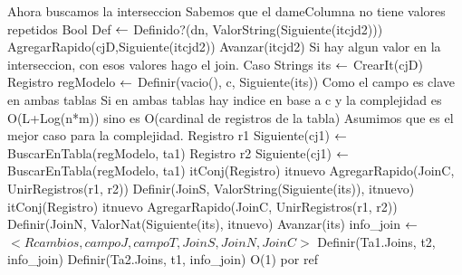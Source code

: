{		\State	Ahora buscamos la interseccion
		 
			\State Sabemos que el dameColumna no tiene valores repetidos
			\State Bool Def $\leftarrow$ Definido?(dn, ValorString(Siguiente(itcjd2)))
				AgregarRapido(cjD,Siguiente(itcjd2))
		     \EndIf
			\State	Avanzar(itcjd2)
		\EndWhile
	\EndIf
	\State Si hay algun valor en la interseccion, con esos valores hago el join.
		\State Caso Strings
		\State its $\leftarrow$ CrearIt(cjD) 
		 
			\State	Registro regModelo $\leftarrow$ Definir(vacio(), c, Siguiente(its))
			\State	Como el campo es clave en ambas tablas
			\State	Si en ambas tablas hay indice en base a c y la complejidad es 
			\State	O(L+Log(n*m)) sino es O(cardinal de registros de la tabla)
			\State	Asumimos que es el mejor caso para la complejidad.
			\State Registro r1 Siguiente(cj1) $\leftarrow$ BuscarEnTabla(regModelo, ta1)
			\State Registro r2 Siguiente(cj1) $\leftarrow$ BuscarEnTabla(regModelo, ta1)
				\State itConj(Registro) itnuevo AgregarRapido(JoinC, UnirRegistros(r1, r2))
				\State Definir(JoinS, ValorString(Siguiente(its)), itnuevo)
			\Else
				\State itConj(Registro) itnuevo AgregarRapido(JoinC, UnirRegistros(r1, r2))
				\State Definir(JoinN, ValorNat(Siguiente(its), itnuevo)
			\EndIf
			\State Avanzar(its)
		\EndWhile
	\EndIf
	\State info\_join $\leftarrow$ $<Rcambios, campoJ, campoT, JoinS, JoinN, JoinC>$
	\State Definir(Ta1.Joins, t2, info\_join)
	\State Definir(Ta2.Joins, t1, info\_join)
}{O(1) por ref}
